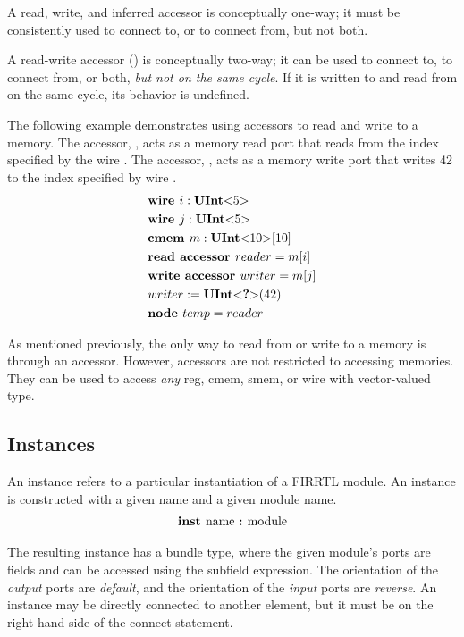 \documentclass[12pt]{article}
\begin{document}
A read, write, and inferred accessor is conceptually one-way; it must be consistently used to connect to, or to connect from, but not both.

A read-write accessor () is conceptually two-way; it can be used to connect to, to connect from, or both, {\em but not on the same cycle}.
If it is written to and read from on the same cycle, its behavior is undefined.

The following example demonstrates using accessors to read and write to a memory.
The accessor, , acts as a memory read port that reads from the index specified by the wire .
The accessor, , acts as a memory write port that writes 42 to the index specified by wire .
\[
\begin{aligned}
&\text{\bf wire\ } i : \text{\bf UInt}\text{\bf $<$} 5 \text{\bf $>$} \\
&\text{\bf wire\ } j : \text{\bf UInt}\text{\bf $<$} 5 \text{\bf $>$} \\
&\text{\bf cmem\ } m : \text{\bf UInt}\text{\bf $<$} 10 \text{\bf $>$}[10] \\
&\text{\bf read\ } \text{\bf accessor\ } reader = m[i] \\
&\text{\bf write\ } \text{\bf accessor\ } writer = m[j] \\
&writer := \text{\bf UInt}\text{\bf $<$} \text{\bf ?} \text{\bf $>$}(42) \\
&\text{\bf node\ } temp = reader \\
\end{aligned}
\]

As mentioned previously, the only way to read from or write to a memory is through an accessor.
However, accessors are not restricted to accessing memories.
They can be used to access {\em any} reg, cmem, smem, or wire with vector-valued type.

\subsection{Instances}
An instance refers to a particular instantiation of a FIRRTL module.
An instance is constructed with a given name and a given module name.
\[
\begin{aligned}
\text{\bf inst\ } \text{name } \text{\bf :\ } \text{module}
\end{aligned}
\]

The resulting instance has a bundle type, where the given module's ports are fields and can be accessed using the subfield expression.
The orientation of the {\em output} ports are {\em default}, and the orientation of the {\em input} ports are {\em reverse}.
An instance may be directly connected to another element, but it must be on the right-hand side of the connect statement.
\end{document}
